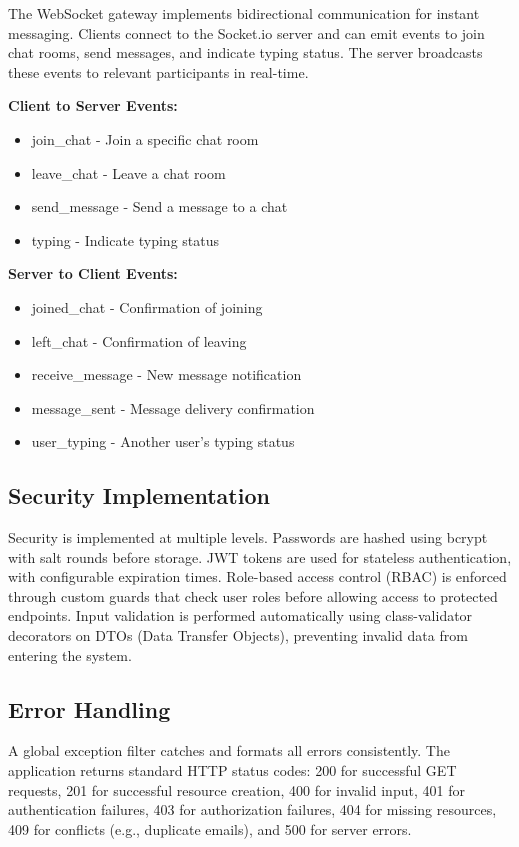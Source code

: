 The WebSocket gateway implements bidirectional communication for instant messaging. Clients connect to the Socket.io server and can emit events to join chat rooms, send messages, and indicate typing status. The server broadcasts these events to relevant participants in real-time.

\textbf{Client to Server Events:}
\begin{itemize}
    \item join\_chat - Join a specific chat room
    \item leave\_chat - Leave a chat room
    \item send\_message - Send a message to a chat
    \item typing - Indicate typing status
\end{itemize}

\textbf{Server to Client Events:}
\begin{itemize}
    \item joined\_chat - Confirmation of joining
    \item left\_chat - Confirmation of leaving
    \item receive\_message - New message notification
    \item message\_sent - Message delivery confirmation
    \item user\_typing - Another user's typing status
\end{itemize}

\subsection{Security Implementation}

Security is implemented at multiple levels. Passwords are hashed using bcrypt with salt rounds before storage. JWT tokens are used for stateless authentication, with configurable expiration times. Role-based access control (RBAC) is enforced through custom guards that check user roles before allowing access to protected endpoints. Input validation is performed automatically using class-validator decorators on DTOs (Data Transfer Objects), preventing invalid data from entering the system.

\subsection{Error Handling}

A global exception filter catches and formats all errors consistently. The application returns standard HTTP status codes: 200 for successful GET requests, 201 for successful resource creation, 400 for invalid input, 401 for authentication failures, 403 for authorization failures, 404 for missing resources, 409 for conflicts (e.g., duplicate emails), and 500 for server errors.

